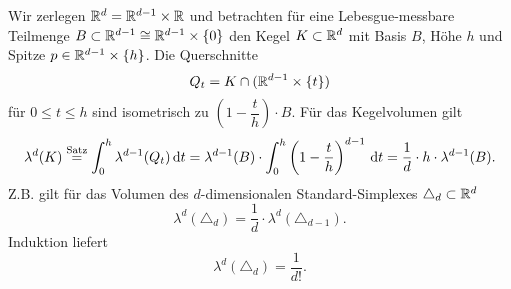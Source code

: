 \begin{example}
Wir zerlegen $\mathbb{R}^d=\mathbb{R}^{d-1}\times \mathbb{R}$ und betrachten für eine Lebesgue-messbare Teilmenge $B\subset \mathbb{R}^{d-1}\cong \mathbb{R}^{d-1}\times\{0\}$ den Kegel $K\subset \mathbb{R}^d$ mit Basis $B$, Höhe $h$ und Spitze $p\in \mathbb{R}^{d-1}\times \{h\}$. Die Querschnitte 
$$Q_t = K\cap (\mathbb{R}^{d-1} \times \{t\})$$
für $0\leq t \leq h$ sind isometrisch zu $\left(1-\dfrac{t}{h}\right)\cdot B$. Für das Kegelvolumen gilt
\begin{equation*}
\begin{split}
	\lambda^d(K) \overset{\text{Satz}}= \int_0^h \lambda^{d-1} (Q_t)\, \mathrm{d} t 
	=\lambda^{d-1}(B) \cdot \int_0^h \left( 1- \frac{t}{h}\right)^{d-1} \, \mathrm{d} t = \frac{1}{d}\cdot h \cdot \lambda^{d-1}(B).
\end{split}
\end{equation*}
Z.B. gilt für das Volumen des $d$-dimensionalen Standard-Simplexes $\triangle_d \subset \mathbb{R}^d$
$$\lambda^d(\triangle_d)=\frac{1}{d}\cdot \lambda^d (\triangle_{d-1}).$$
Induktion liefert
$$\lambda^d(\triangle_d)=\frac{1}{d!}.$$
\end{example}

